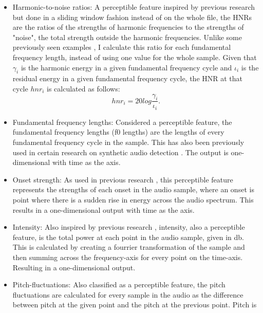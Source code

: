 \documentclass{article}
\begin{document}
			\begin{itemize}
				\item
					\sloppy
					Harmonic-to-noise ratios: A perceptible feature inspired by previous research
					\cite{chaiwongyen_contribution_2022,chaiwongyen_deepfake-speech_2023,
					li_comparative_2022} but done in a sliding window fashion instead of on the
					whole file, the HNRs are the ratios of the strengths of harmonic frequencies
					to the strengths of "noise", the total strength outside the harmonic
					frequencies. Unlike some previously seen examples
					\cite{chaiwongyen_contribution_2022, chaiwongyen_deepfake-speech_2023}, I
					calculate this ratio for each fundamental frequency length, instead of using
					one value for the whole sample. Given that \(\gamma_{i}\) is the harmonic
					energy in a given fundamental frequency cycle and \(\iota_{i}\) is the
					residual energy in a given fundamental frequency cycle, the HNR at that cycle
					\(hnr_{i}\) is calculated as follows:
					\[ hnr_{i} = 20log\frac{\gamma_{i}}{\iota_{i}}. \]
				\item
					Fundamental frequency lengths: Considered a perceptible feature, the
					fundamental frequency lengths (f0 lengths) are the lengths of every
					fundamental frequency cycle in the sample. This has also been previously used
					in certain research on synthetic audio detection \cite{xue_audio_2022}. The
					output is one-dimensional with time as the axis.
				\item
					Onset strength: As used in previous research \cite{li_comparative_2022}, this
					perceptible feature represents the strengths of each onset in the audio
					sample, where an onset is point where there is a sudden rise in energy across
					the audio spectrum. This results in a one-dimensional output with time as the
					axis.
				\item
					Intensity: Also inspired by previous research \cite{li_comparative_2022},
					intensity, also a perceptible feature, is the total power at each point in the
					audio sample, given in db. This is calculated by creating a fourrier
					transformation of the sample and then summing across the frequency-axis for
					every point on the time-axis. Resulting in a one-dimensional output.
				\item
					Pitch-fluctuations: Also classified as a perceptible feature, the pitch
					fluctuations are calculated for every sample in the audio as the difference
					between pitch at the given point and the pitch at the previous point. Pitch is

\end{itemize}
\end{document}
